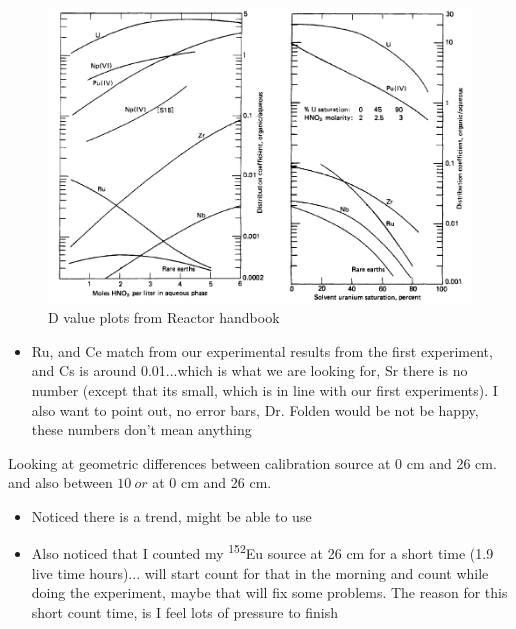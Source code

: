 \documentclass[idxtotoc,hyperref,openany,oneside]{labbook} %
\newcommand{\cmark}{\ding{51}}%
\newcommand{\done}{\rlap{$\square$}{\raisebox{2pt}{\large\hspace{1pt}\cmark}}%
  \hspace{-2.5pt}}
\newcommand{\tss}{\textsuperscript}
\begin{document}
\begin{figure}[H] %
\begin{center}
  \includegraphics[width=0.8\linewidth]
                  {Figures/D_Values_Variations}
\end{center}
\caption{D value plots from Reactor handbook}
\label{fig:D_V_handbook}
\end{figure}






\begin{itemize}
\item{Ru, and Ce match from our experimental results from the first
  experiment,
  and Cs is around 0.01...which is what we are looking for,
  Sr there is no number (except that its small, which is in line
  with our first experiments). I also want to point out, no error bars,
  Dr. Folden would be not be happy, these numbers don't mean anything}
\end{itemize}
\begin{todolist}
\item[\done]{Looking at geometric differences between calibration
  source at 0 cm and 26 cm. and also between $\boxed{10\ or}$ at
  0 cm and 26 cm.}
  \begin{itemize}
  \item{Noticed there is a trend, might be able to use}
  \item{Also noticed that I counted my \tss{152}Eu source at
    26 cm for a short time (1.9 live time hours)...
    will start count for that in
    the morning and count while doing the experiment,
    maybe that will fix some problems. The reason for this
    short count time, is I feel lots of pressure to finish}
  \end{itemize}
\end{todolist}
\end{document}
